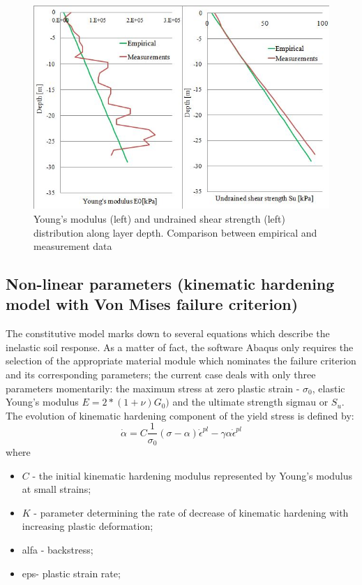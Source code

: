 \documentclass[11pt,a4paper]{report}
\begin{document}
\begin{figure}[!h]
\centering
\includegraphics[width=0.7 \textwidth]{"youngss1"}
\caption{Young's modulus (left) and undrained shear strength (left) distribution along layer depth. Comparison between empirical and measurement data}
\label{youngss}
\end{figure}

\newpage
\subsection{Non-linear parameters (kinematic hardening  model with Von Mises failure criterion)}
The constitutive model marks down to several equations which describe the inelastic soil response. As a matter of fact, the software Abaqus only requires the selection of the appropriate material module which nominates the failure criterion and its corresponding parameters; the current case deals with only three parameters momentarily: the maximum stress at zero plastic strain - $\sigma_0$, elastic Young's modulus $E=2*(1+\nu)G_0)$ and the ultimate strength \gls{sigmau} or $S_u$.
The evolution of kinematic hardening component of the yield stress is defined by:
\begin{equation}
		\dot{\alpha}=C\frac{1}{\sigma_0}(\sigma-\alpha)\dot{\epsilon}^{pl}-\gamma\alpha\dot{\epsilon}^{pl}
\end{equation}
where
\begin{itemize}
	\item $C$ - the initial kinematic hardening modulus represented by Young's modulus at small strains;
	\item $K$ - parameter determining the rate of decrease of kinematic hardening with increasing plastic deformation;
	\item \gls{alfa} - backstress;
	\item \gls{eps}- plastic strain rate;
\end{itemize}
\end{document}
